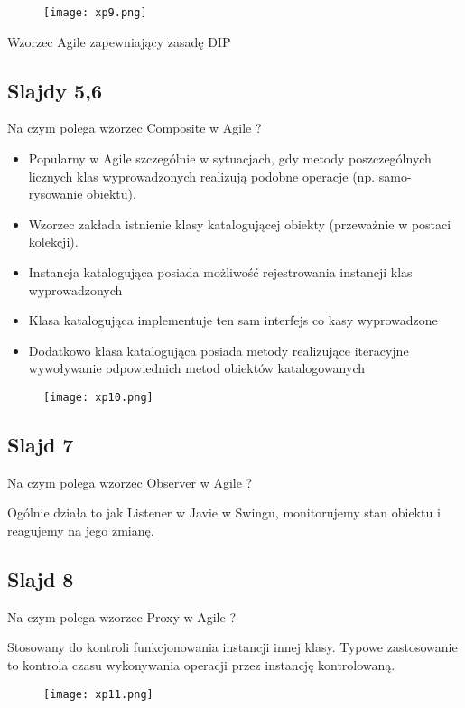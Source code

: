 \documentclass[a4paper,15pt]{article}
\newcommand{\question}[2]{
    \begin{tcolorbox}[colback=mRed!5!white,colframe=mRed,title={Kolokwium 2018 #1}]
        #2
    \end{tcolorbox}
}
\begin{document}
\begin{figure}[H]
\centerline{\texttt{[image: xp9.png]}}
\end{figure}
\question{}{
Wzorzec Agile zapewniający zasadę DIP 
}


\subsection{Slajdy 5,6}
\begin{framed}
Na czym polega wzorzec Composite w Agile ?
\end{framed}
\begin{itemize}
\item Popularny w Agile szczególnie w sytuacjach, gdy metody poszczególnych licznych klas wyprowadzonych realizują podobne operacje (np. samo-rysowanie obiektu).
\item Wzorzec zakłada istnienie klasy katalogującej obiekty (przeważnie w postaci kolekcji). 
\item Instancja katalogująca posiada możliwość rejestrowania instancji klas wyprowadzonych
\item Klasa katalogująca implementuje ten sam interfejs co kasy wyprowadzone
\item Dodatkowo klasa katalogująca posiada metody realizujące iteracyjne wywoływanie odpowiednich metod obiektów katalogowanych
\end{itemize}

\begin{figure}[H]
\centerline{\texttt{[image: xp10.png]}}
\end{figure}

\subsection{Slajd 7}
\begin{framed}
Na czym polega wzorzec Observer w Agile ?
\end{framed}
Ogólnie działa to jak Listener w Javie w Swingu, monitorujemy stan obiektu i reagujemy na jego zmianę.


\subsection{Slajd 8}
\begin{framed}
Na czym polega wzorzec Proxy w Agile ?
\end{framed}
Stosowany do kontroli funkcjonowania instancji innej klasy. Typowe zastosowanie to kontrola czasu wykonywania operacji przez instancję kontrolowaną.
\begin{figure}[H]
\centerline{\texttt{[image: xp11.png]}}
\end{figure}
\end{document}
